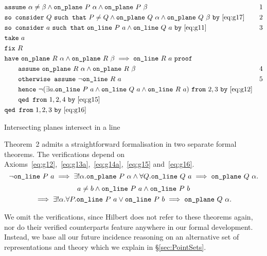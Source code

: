 \begin{boxedfigure}
\small
  \begin{align*}
    &\code{assume}\ \alpha\neq\beta \wedge \code{on\_plane}\ P\ \alpha\wedge\code{on\_plane}\ P\ \beta & 1\\
    &\code{so consider}\ Q\ \code{such that}\ P\neq Q \wedge\code{on\_plane}\ Q\ \alpha \wedge\code{on\_plane}\ Q\ \beta\ \code{by}\ \eqref{eq:g17} & 2\\
    &\code{so consider}\ a\ \code{such that}\ \code{on\_line}\ P\ a\wedge\code{on\_line}\ Q\ a\ \code{by}\ \eqref{eq:g11} & 3\\
    &\code{take}\ a\\
    &\code{fix}\ R\\
    &\code{have}\ \code{on\_plane}\ R\ \alpha\wedge\code{on\_plane}\ R\ \beta \implies \code{on\_line}\ R\ a\ \code{proof}\\
    &\qquad\code{assume}\ \code{on\_plane}\ R\ \alpha\wedge\code{on\_plane}\ R\ \beta & 4\\
    &\qquad\code{otherwise assume}\ \neg\code{on\_line}\ R\ a & 5\\
    &\qquad\code{hence}\ \Triangle{a}{P}{Q}{R}\ \code{from}\ 2,3\ \code{by}\ \eqref{eq:g12}\\
    &\qquad\code{qed from}\ 1,2,4\ \code{by}\ \eqref{eq:g15}\\
    &\code{qed from}\ 1,2,3\ \code{by}\ \eqref{eq:g16}
  \end{align*}
  \caption{Intersecting planes intersect in a line}
  \label{fig:Theorem1}
\end{boxedfigure}

Theorem~2 admits a straightforward formalisation in two separate formal theorems. The verifications depend on Axioms~\ref{eq:g12},~\ref{eq:g13a},~\ref{eq:g14a},~\ref{eq:g15} and~\ref{eq:g16}. 
\begin{displaymath}
  \neg\texttt{on\_line}\ P\ a \implies \exists!\alpha. \texttt{on\_plane}\ P\ \alpha \wedge \forall Q. \texttt{on\_line}\ Q\ a \implies \texttt{on\_plane}\ Q\ \alpha.
\end{displaymath}
\begin{multline}
  a\neq b\wedge\texttt{on\_line}\ P\ a\wedge\texttt{on\_line}\ P\ b\\
  \implies\exists!\alpha. \forall P. \texttt{on\_line}\ P\ a \vee \texttt{on\_line}\ P\ b \implies\texttt{on\_plane}\ Q\ \alpha.
\end{multline}

We omit the verifications, since Hilbert does not refer to these theorems again, nor do their verified counterparts feature anywhere in our formal development. Instead, we base all our future incidence reasoning on an alternative set of representations and theory which we explain in \S\ref{sec:PointSets}. 

